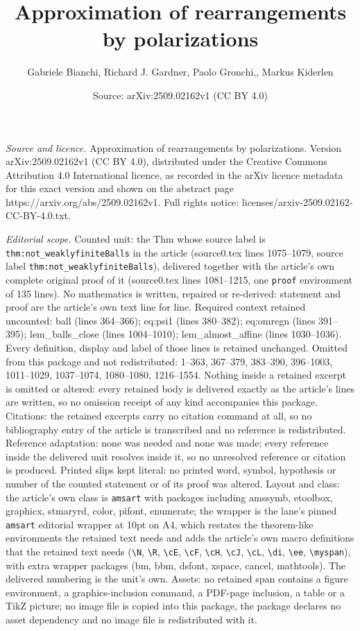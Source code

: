 \documentclass[10pt,a4paper]{amsart}
\title[Approximation of rearrangements by polarizations]{Approximation of rearrangements by polarizations}
\author{Gabriele Bianchi, Richard J. Gardner, Paolo Gronchi,, Markus Kiderlen}
\date{Source: arXiv:2509.02162v1 (CC BY 4.0)}
\begin{document}
\maketitle

\noindent\emph{Source and licence.} Approximation of rearrangements by polarizations. Version arXiv:2509.02162v1 (CC BY 4.0), distributed under the Creative Commons Attribution 4.0 International licence, as recorded in the arXiv licence metadata for this exact version and shown on the abstract page https://arxiv.org/abs/2509.02162v1. Full rights notice: licenses/arxiv-2509.02162-CC-BY-4.0.txt.\par\smallskip

\noindent\textit{Editorial scope.} Counted unit: the Thm whose source label is \texttt{thm:not\_weaklyfiniteBalls} in the article (source0.tex lines 1075--1079, source label \texttt{thm:not\_weaklyfiniteBalls}), delivered together with the article's own complete original proof of it (source0.tex lines 1081--1215, one \texttt{proof} environment of 135 lines). No mathematics is written, repaired or re-derived: statement and proof are the article's own text line for line. Required context retained uncounted: ball (lines 364--366); eq:psi1 (lines 380--382); eq:omregn (lines 391--395); lem\_balls\_close (lines 1004--1010); lem\_almost\_affine (lines 1030--1036). Every definition, display and label of those lines is retained unchanged. Omitted from this package and not redistributed: 1--363, 367--379, 383--390, 396--1003, 1011--1029, 1037--1074, 1080--1080, 1216--1554. Nothing inside a retained excerpt is omitted or altered: every retained body is delivered exactly as the article's lines are written, so no omission receipt of any kind accompanies this package. Citations: the retained excerpts carry no citation command at all, so no bibliography entry of the article is transcribed and no reference is redistributed. Reference adaptation: none was needed and none was made; every reference inside the delivered unit resolves inside it, so no unresolved reference or citation is produced. Printed slips kept literal: no printed word, symbol, hypothesis or number of the counted statement or of its proof was altered. Layout and class: the article's own class is \texttt{amsart} with packages including amssymb, etoolbox, graphicx, stmaryrd, color, pifont, enumerate; the wrapper is the lane's pinned \texttt{amsart} editorial wrapper at 10pt on A4, which restates the theorem-like environments the retained text needs and adds the article's own macro definitions that the retained text needs (\texttt{\textbackslash N}, \texttt{\textbackslash R}, \texttt{\textbackslash cE}, \texttt{\textbackslash cF}, \texttt{\textbackslash cH}, \texttt{\textbackslash cJ}, \texttt{\textbackslash cL}, \texttt{\textbackslash di}, \texttt{\textbackslash ee}, \texttt{\textbackslash myspan}), with extra wrapper packages (bm, bbm, dsfont, xspace, cancel, mathtools). The delivered numbering is the unit's own. Assets: no retained span contains a figure environment, a graphics-inclusion command, a PDF-page inclusion, a table or a TikZ picture; no image file is copied into this package, the package declares no asset dependency and no image file is redistributed with it. 
\end{document}

